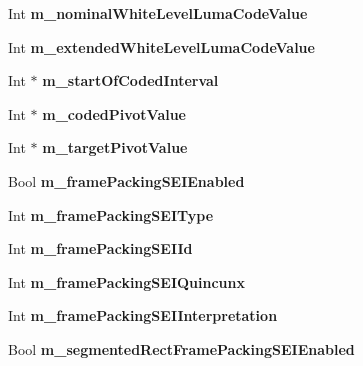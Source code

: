 \begin{DoxyCompactItemize}
\mbox{\label{class_t_enc_cfg_ab3cafb4f7a8d8eefe53bf3a13b9cde98}} 
Int {\bfseries m\+\_\+nominal\+White\+Level\+Luma\+Code\+Value}
\item 
\mbox{\label{class_t_enc_cfg_abc96ccf9a9b0bb060b3a6024da005476}} 
Int {\bfseries m\+\_\+extended\+White\+Level\+Luma\+Code\+Value}
\item 
\mbox{\label{class_t_enc_cfg_ac6d07971473eec342db2891c7c59f5f3}} 
Int $\ast$ {\bfseries m\+\_\+start\+Of\+Coded\+Interval}
\item 
\mbox{\label{class_t_enc_cfg_a587e45becc0c227705731429eaf9cf0a}} 
Int $\ast$ {\bfseries m\+\_\+coded\+Pivot\+Value}
\item 
\mbox{\label{class_t_enc_cfg_ac967339792cb6458b9763e41e1972640}} 
Int $\ast$ {\bfseries m\+\_\+target\+Pivot\+Value}
\item 
\mbox{\label{class_t_enc_cfg_a38dfa9179e1299833e7f4e7c6445e3e8}} 
Bool {\bfseries m\+\_\+frame\+Packing\+S\+E\+I\+Enabled}
\item 
\mbox{\label{class_t_enc_cfg_afbcc6900c69d05c33583741e2a2708c4}} 
Int {\bfseries m\+\_\+frame\+Packing\+S\+E\+I\+Type}
\item 
\mbox{\label{class_t_enc_cfg_a627f9312ebe388c5f108f39002469775}} 
Int {\bfseries m\+\_\+frame\+Packing\+S\+E\+I\+Id}
\item 
\mbox{\label{class_t_enc_cfg_a1727e97225d60206ebfd06c5e9302718}} 
Int {\bfseries m\+\_\+frame\+Packing\+S\+E\+I\+Quincunx}
\item 
\mbox{\label{class_t_enc_cfg_a0a27232b85a65cf8528b35ce65251d01}} 
Int {\bfseries m\+\_\+frame\+Packing\+S\+E\+I\+Interpretation}
\item 
\mbox{\label{class_t_enc_cfg_a22275851744efda11834b2db998641c2}} 
Bool {\bfseries m\+\_\+segmented\+Rect\+Frame\+Packing\+S\+E\+I\+Enabled}
\item 
\mbox{\label{class_t_enc_cfg_aec0d78a1d2ac1006a2a829ee5c49d045}} 

\end{DoxyCompactItemize}
